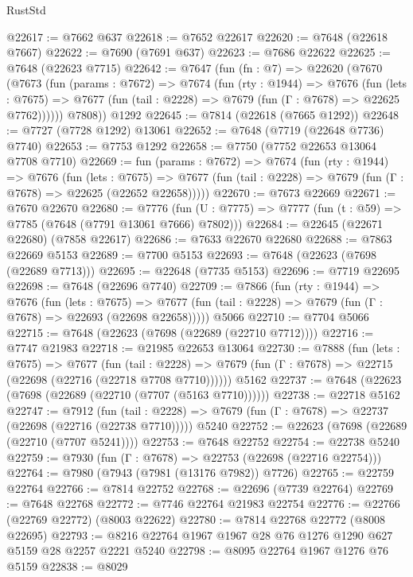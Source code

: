 \begin{lexlean}{RustStd}
\begin{coremodule}
{\begin{coremodule}
{{{{{{{{{{{{{{{{{{{{{{{{{{{{{{{{{{{{{{{{{{{{{{{{{{{{{@22617 := @7662 @637
@22618 := @7652 @22617
@22620 := @7648 (@22618 @7667)
@22622 := @7690 (@7691 @637)
@22623 := @7686 @22622
@22625 := @7648 (@22623 @7715)
@22642 := @7647
    (fun (fn : @7) =>
    @22620
      (@7670
        (@7673
          (fun (params : @7672) =>
          @7674
            (fun (rty : @1944) =>
            @7676
              (fun (lets : @7675) =>
              @7677 (fun (tail : @2228) => @7679 (fun (Γ : @7678) => @22625 @7762))))))
        @7808))
    @1292
@22645 := @7814 (@22618 (@7665 @1292))
@22648 := @7727 (@7728 @1292) @13061
@22652 := @7648 (@7719 (@22648 @7736) @7740)
@22653 := @7753 @1292
@22658 := @7750 (@7752 @22653 @13064 @7708 @7710)
@22669 := fun (params : @7672) =>
  @7674
    (fun (rty : @1944) =>
    @7676
      (fun (lets : @7675) =>
      @7677 (fun (tail : @2228) => @7679 (fun (Γ : @7678) => @22625 (@22652 @22658)))))
@22670 := @7673 @22669
@22671 := @7670 @22670
@22680 := @7776
    (fun (U : @7775) => @7777 (fun (t : @59) => @7785 (@7648 (@7791 @13061 @7666) @7802)))
@22684 := @22645 (@22671 @22680) (@7858 @22617)
@22686 := @7633 @22670 @22680
@22688 := @7863 @22669 @5153
@22689 := @7700 @5153
@22693 := @7648 (@22623 (@7698 (@22689 @7713)))
@22695 := @22648 (@7735 @5153)
@22696 := @7719 @22695
@22698 := @7648 (@22696 @7740)
@22709 := @7866
    (fun (rty : @1944) =>
    @7676
      (fun (lets : @7675) =>
      @7677 (fun (tail : @2228) => @7679 (fun (Γ : @7678) => @22693 (@22698 @22658)))))
    @5066
@22710 := @7704 @5066
@22715 := @7648 (@22623 (@7698 (@22689 (@22710 @7712))))
@22716 := @7747 @21983
@22718 := @21985 @22653 @13064
@22730 := @7888
    (fun (lets : @7675) =>
    @7677
      (fun (tail : @2228) =>
      @7679 (fun (Γ : @7678) => @22715 (@22698 (@22716 (@22718 @7708 @7710))))))
    @5162
@22737 := @7648 (@22623 (@7698 (@22689 (@22710 (@7707 (@5163 @7710))))))
@22738 := @22718 @5162
@22747 := @7912
    (fun (tail : @2228) => @7679 (fun (Γ : @7678) => @22737 (@22698 (@22716 (@22738 @7710)))))
    @5240
@22752 := @22623 (@7698 (@22689 (@22710 (@7707 @5241))))
@22753 := @7648 @22752
@22754 := @22738 @5240
@22759 := @7930 (fun (Γ : @7678) => @22753 (@22698 (@22716 @22754)))
@22764 := @7980 (@7943 (@7981 (@13176 @7982)) @7726)
@22765 := @22759 @22764
@22766 := @7814 @22752
@22768 := @22696 (@7739 @22764)
@22769 := @7648 @22768
@22772 := @7746 @22764 @21983 @22754
@22776 := @22766 (@22769 @22772) (@8003 @22622)
@22780 := @7814 @22768 @22772 (@8008 @22695)
@22793 := @8216 @22764 @1967 @1967 @28 @76 @1276 @1290 @627 @5159 @28 @2257 @2221 @5240
@22798 := @8095 @22764 @1967 @1276 @76 @5159
@22838 := @8029
}}}}}}}}}}}}}}}}}}}}}}}}}}}}}}}}}}}}}}}}}}}}}}}}}}}}}
\end{coremodule}}
\end{coremodule}
\end{lexlean}
